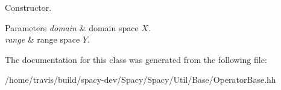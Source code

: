 Constructor. 


\begin{DoxyParams}{Parameters}
{\em domain} & domain space $X$. \\
\hline
{\em range} & range space $Y$. \\
\hline
\end{DoxyParams}


The documentation for this class was generated from the following file\-:\begin{DoxyCompactItemize}
\item 
/home/travis/build/spacy-\/dev/\-Spacy/\-Spacy/\-Util/\-Base/Operator\-Base.\-hh\end{DoxyCompactItemize}
